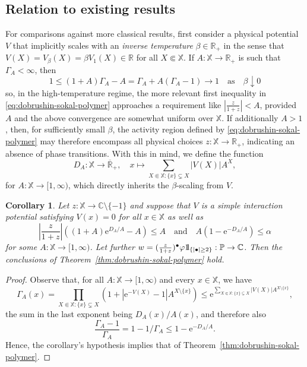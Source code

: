 \documentclass[reqno, 11pt]{amsart}
\newtheorem{cor}[theorem]{Corollary}
\theoremstyle{definition}
\newcommand{\e}{\mathrm{e}}
\newcommand{\R}{\mathbb{R}}
\newcommand{\C}{\mathbb{C}}
\renewcommand{\P}{\mathbb{P}}
\newcommand{\X}{\mathbb X}
\def\1{{\mathchoice {1\mskip-4mu\mathrm l}      
{1\mskip-4mu\mathrm l}
{1\mskip-4.5mu\mathrm l} {1\mskip-5mu\mathrm l}}}
\begin{document}
\subsection{Relation to existing results}

For comparisons against more classical results, first consider a physical potential $V$ that implicitly scales with an \emph{inverse temperature} $\beta \in \R_+$ in the sense that $V(X) = V_\beta(X) = \beta V_1(X) \in \R$ for all $X \Subset \X$. 
If $A : \X \to \R_+$ is such that $\Gamma_A < \infty$, then
\[
	1 \leq (1+A) \Gamma_A - A = \Gamma_A + A (\Gamma_A - 1) \to 1 \quad \text{as} \quad \beta \downarrow 0
\]
so, in the high-temperature regime, the more relevant first inequality in \eqref{eq:dobrushin-sokal-polymer} approaches a requirement like $|\frac{z}{1+z}| < A$, provided $A$ and the above convergence are somewhat uniform over $\X$. 
If additionally $A > 1$, then, for sufficiently small $\beta$, the activity region defined by \eqref{eq:dobrushin-sokal-polymer} may therefore encompass all physical choices $z : \X \to \R_+$, indicating an absence of phase transitions. 
With this in mind, we define the function
\[
	D_A : \X \to \overline{\R}_+, \quad x \mapsto \sum_{X \Subset \X : \{x\} \subsetneq X} |V(X)| A^X,
\]
for $A : \X \to [1,\infty)$, which directly inherits the $\beta$-scaling from $V$.

\begin{cor} \label{cor:gallavotti-miracle-sole-robinson-refined}
	Let $z : \X \to \C \setminus \{-1\}$ and suppose that $V$ is a simple interaction potential satisfying $V(x) = 0$ for all $x \in \X$ as well as
	\[
		|{\textstyle \frac{z}{1+z}}| ((1 + A) \e^{D_A/A} - A) \leq A \quad \text{and} \quad A (1-\e^{-D_A / A}) \leq \alpha
	\]
	for some $A : \X \to [1,\infty)$. 
	Let further $w = (\frac{z}{1+z})^\bullet \varphi \1_{\{|\bullet| \geq 2\}} : \P \to \C$. 
	Then the conclusions of Theorem~\ref{thm:dobrushin-sokal-polymer} hold.
\end{cor}

\begin{proof}
	Observe that, for all $A : \X \to [1,\infty)$ and every $x \in \X$, we have 
	\[
		\Gamma_A(x) = \prod_{X \Subset \X : \{x\} \subsetneq X} (1+|\e^{-V(X)}-1| A^{X \setminus \{x\}}) \leq \e^{\sum_{X \Subset \X : \{x\} \subsetneq X} |V(X)| A^{X \setminus \{x\}}},
	\]
	the sum in the last exponent being $D_A(x)/A(x)$, and therefore also
	\[
		{\textstyle \frac{\Gamma_A-1}{\Gamma_A}} = 1 - 1/\Gamma_A \leq 1 - \e^{-D_A / A}.
	\]
	Hence, the corollary's hypothesis implies that of Theorem~\ref{thm:dobrushin-sokal-polymer}.
\end{proof}
\end{document}
